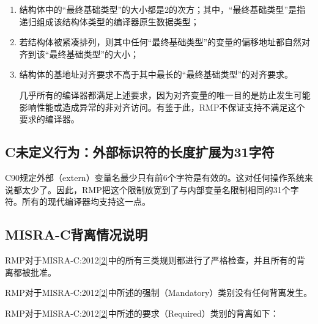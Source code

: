 \begin{enumerate}
\def\labelenumi{\arabic{enumi}.}
\item
  结构体中的``最终基础类型''的大小都是2的次方；其中，``最终基础类型''是指递归组成该结构体类型的编译器原生数据类型；
\item
  若结构体被紧凑排列，则其中任何``最终基础类型''的变量的偏移地址都自然对齐到该``最终基础类型''的大小；
\item
  结构体的基地址对齐要求不高于其中最长的``最终基础类型''的对齐要求。

  几乎所有的编译器都满足上述要求，因为对齐变量的唯一目的是防止发生可能影响性能或造成异常的非对齐访问。有鉴于此，RMP不保证支持不满足这个要求的编译器。
\end{enumerate}

\subsection{C未定义行为：外部标识符的长度扩展为31字符}\label{subsec:c-undefined-behaviour-external-identifiers-are-extended-to-31-characters}

C90规定外部（extern）变量名最少只有前6个字符是有效的。这对任何操作系统来说都太少了。因此，RMP把这个限制放宽到了与内部变量名限制相同的31个字符。所有的现代编译器均支持这一点。

\subsection{MISRA-C背离情况说明}\label{subsec:misra-c-deviations}

RMP对于MISRA-C:2012\hyperref[sec:chapter-bibliography-11]{{[}2{]}}中的所有三类规则都进行了严格检查，并且所有的背离都被批准。

RMP对于MISRA-C:2012\hyperref[sec:chapter-bibliography-11]{{[}2{]}}中所述的强制（Mandatory）类别没有任何背离发生。

RMP对于MISRA-C:2012\hyperref[sec:chapter-bibliography-11]{{[}2{]}}中所述的要求（Required）类别的背离如下：

\label{tab:rmp-deviations-from-the-required-part-of-misra-c-2012}

